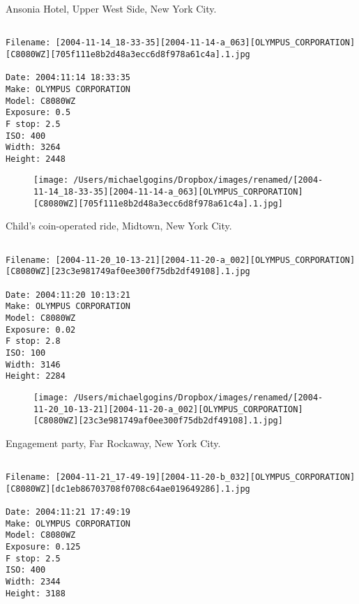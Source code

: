 \documentclass[11pt,letter,DIV=14,paper=landscape]{scrbook}
\begin{document}
\clearpage
\noindent Ansonia Hotel, Upper West Side, New York City.
\noindent
\begin{lstlisting}

Filename: [2004-11-14_18-33-35][2004-11-14-a_063][OLYMPUS_CORPORATION][C8080WZ][705f111e8b2d48a3ecc6d8f978a61c4a].1.jpg

Date: 2004:11:14 18:33:35
Make: OLYMPUS CORPORATION
Model: C8080WZ
Exposure: 0.5
F stop: 2.5
ISO: 400
Width: 3264
Height: 2448
\end{lstlisting}
\clearpage

\begin{figure}
\texttt{[image: /Users/michaelgogins/Dropbox/images/renamed/[2004-11-14\_18-33-35][2004-11-14-a\_063][OLYMPUS\_CORPORATION][C8080WZ][705f111e8b2d48a3ecc6d8f978a61c4a].1.jpg]}
\end{figure}
    
\clearpage
\noindent Child's coin-operated ride, Midtown, New York City.
\noindent
\begin{lstlisting}

Filename: [2004-11-20_10-13-21][2004-11-20-a_002][OLYMPUS_CORPORATION][C8080WZ][23c3e981749af0ee300f75db2df49108].1.jpg

Date: 2004:11:20 10:13:21
Make: OLYMPUS CORPORATION
Model: C8080WZ
Exposure: 0.02
F stop: 2.8
ISO: 100
Width: 3146
Height: 2284
\end{lstlisting}
\clearpage

\begin{figure}
\texttt{[image: /Users/michaelgogins/Dropbox/images/renamed/[2004-11-20\_10-13-21][2004-11-20-a\_002][OLYMPUS\_CORPORATION][C8080WZ][23c3e981749af0ee300f75db2df49108].1.jpg]}
\end{figure}
    
\clearpage
\noindent Engagement party, Far Rockaway, New York City.
\noindent
\begin{lstlisting}

Filename: [2004-11-21_17-49-19][2004-11-20-b_032][OLYMPUS_CORPORATION][C8080WZ][dc1eb86703708f0708c64ae019649286].1.jpg

Date: 2004:11:21 17:49:19
Make: OLYMPUS CORPORATION
Model: C8080WZ
Exposure: 0.125
F stop: 2.5
ISO: 400
Width: 2344
Height: 3188
\end{lstlisting}
\clearpage
\end{document}
